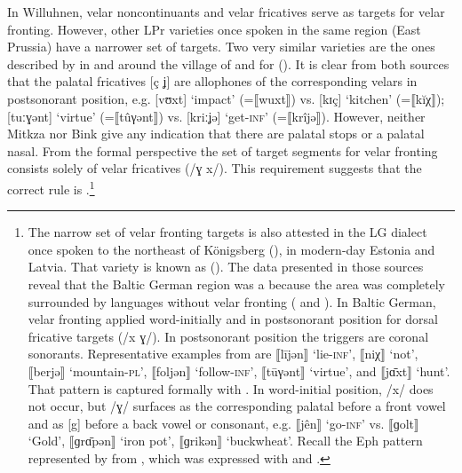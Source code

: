 In Willuhnen, velar noncontinuants and velar fricatives serve as targets for velar fronting. However, other LPr varieties once spoken in the same region (East Prussia) have a narrower set of targets. Two very similar varieties are the ones described by \citet{Bink1953} in and around the village of  and \citet{Mitzka1919} for  (). It is clear from both sources that the palatal fricatives [ç ʝ] are allophones of the corresponding velars in postsonorant position, e.g.  [vʊxt] ‘impact’ (=⟦wuxt⟧) vs. [kɪç] ‘kitchen’ (=⟦kĭχ⟧); [tuːɣənt] ‘virtue’ (=⟦tûγǝnt⟧) vs. [kriːʝə] ‘get-\textsc{inf}’ (=⟦krîjǝ⟧). However, neither Mitkza nor Bink give any indication that there are palatal stops or a palatal nasal. From the formal perspective the set of target segments for velar fronting consists solely of velar fricatives (/ɣ x/). This requirement suggests that the correct rule is .\footnote{The narrow set of velar fronting targets is also attested in the LG dialect once spoken to the northeast of Königsberg (), in modern-day Estonia and Latvia. That variety is known as  (\citealt{Sallmann1872, Mitzka1923b, Mitzka1923, Masing1926, Deeters1939}). The data presented in those sources reveal that the Baltic German region was a  because the area was completely surrounded by languages without velar fronting ( and ). In Baltic German, velar fronting applied word-initially and in postsonorant position for dorsal fricative targets (/x ɣ/). In postsonorant position the triggers are coronal sonorants. Representative examples from \citet{Mitzka1923b} are ⟦lījən⟧ ‘lie-\textsc{inf}’, ⟦niχ⟧ ‘not’,  ⟦berjə⟧ ‘mountain-\textsc{pl}’, ⟦foljən⟧ ‘follow-\textsc{inf}’, ⟦tūγənt⟧ ‘virtue', and ⟦jɑ̄xt⟧ ‘hunt’. That  pattern is captured formally with . In word-initial position, /x/ does not occur, but /ɣ/ surfaces as the corresponding palatal before a front vowel and as [g] before a back vowel or consonant, e.g. ⟦jên⟧ ‘go-\textsc{inf}’ vs. ⟦ɡolt⟧ ‘Gold’, ⟦ɡrɑ̄pən⟧ ‘iron pot', ⟦ɡrikən⟧ ‘buckwheat’. Recall the Eph pattern represented by  from , which was expressed with  and .}

